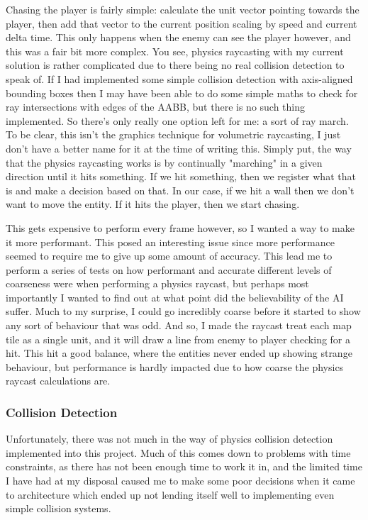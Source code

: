 \documentclass{article}
\begin{document}
Chasing the player is fairly simple: calculate the unit vector pointing towards
the player, then add that vector to the current position scaling by speed and
current delta time. This only happens when the enemy can see the player however,
and this was a fair bit more complex. You see, physics raycasting with my
current solution is rather complicated due to there being no real collision
detection to speak of. If I had implemented some simple collision detection with
axis-aligned bounding boxes then I may have been able to do some simple maths to
check for ray intersections with edges of the AABB, but there is no such thing
implemented. So there's only really one option left for me: a sort of ray march.
To be clear, this isn't the graphics technique for volumetric raycasting, I just
don't have a better name for it at the time of writing this. Simply put, the way
that the physics raycasting works is by continually "marching" in a given
direction until it hits something. If we hit something, then we register what
that is and make a decision based on that. In our case, if we hit a wall then we
don't want to move the entity. If it hits the player, then we start chasing.

This gets expensive to perform every frame however, so I wanted a way to make it
more performant. This posed an interesting issue since more performance seemed
to require me to give up some amount of accuracy. This lead me to perform a
series of tests on how performant and accurate different levels of coarseness
were when performing a physics raycast, but perhaps most importantly I wanted to
find out at what point did the believability of the AI suffer. Much to my
surprise, I could go incredibly coarse before it started to show any sort of
behaviour that was odd. And so, I made the raycast treat each map tile as a
single unit, and it will draw a line from enemy to player checking for a hit.
This hit a good balance, where the entities never ended up showing strange
behaviour, but performance is hardly impacted due to how coarse the physics
raycast calculations are.

\subsubsection{Collision Detection}
Unfortunately, there was not much in the way of physics collision detection
implemented into this project. Much of this comes down to problems with time
constraints, as there has not been enough time to work it in, and the limited
time I have had at my disposal caused me to make some poor decisions when it
came to architecture which ended up not lending itself well to implementing
even simple collision systems.
\end{document}
